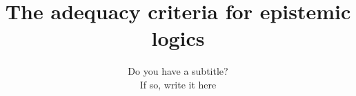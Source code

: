 \usepackage{fancyvrb}
\usepackage{alltt}
\usepackage{listings}

\newcommand{\Rel}[1]{R_{#1}}
\newcommand{\Act}[1]{[ \mathit{#1} ]}
\newcommand{\ActPos}[1]{\langle \mathit{XSTIT_{#1}} \rangle}
\newcommand{\Know}{\mathbf{K}\,} 
\newcommand{\Kns}[1]{\mathbf{K}_{\mathbf{#1}}\,} 
\newcommand{\Bel}{\mathbf{B}\,} 
\newcommand{\Bels}[1]{\mathbf{B}_{\mathbf{#1}}\,} 
\newcommand{\Pos}  {\langle \mathbf{K} \rangle\,} 
\newcommand{\Poss}[1]  {\langle \mathbf{K}_{#1} \rangle\,}
\newcommand{\BPos} {\langle \mathbf{B} \rangle\,}
\newcommand{\BPoss}[1]{\langle \mathbf{B}_{#1} \rangle\,}
\newcommand{\STIT}[1] {\mathbf{[XSTIT\ {#1}]}}
\newcommand{\Safe} {\mathbf{S}}
\newcommand{\safe} {\mathit{safe}}
\newcommand{\choice}[1]{\mathit{Choice_{#1}}}
\newcommand{\neXt}{\mathit{X}}
\newcommand{\Pal}[1]{\mathbf{[#1]}}
\newcommand{\PalPos}[1]{\mathbf{\langle#1\rangle}}
\newcommand{\SPal}[1]{\mathbf{[#1]^\mathcal{S}}}
\newcommand{\SPalPos}[1]{\mathbf{\langle#1\rangle^\mathcal{S}}}
%
\newcommand{\etal}{\textit{et.~al.}}
\newcommand{\nnot}{\textsf{\ not \ }}
\newcommand{\oor}{\textsf{\  or \ }}
\newcommand{\iiff}{{\  \Leftrightarrow \ }}
\newcommand {\aand}{ \textsf{\ and \ } }
\newcommand {\timplies} { \textsf{\ implies \ }}
\newcommand {\tland}{{\ \wedge \ }}
\newcommand {\tlor}{{\ \vee \ }}
\newcommand {\tlnot}{{\neg}}
\newcommand {\iimplies}{{\ \Rightarrow \ }}

\newenvironment{proofenum}{%
	\begin{enumerate}
		\renewcommand\labelenumi{(\arabic{section}.\arabic{enumi})}}
	{\end{enumerate}}
%


\title{The adequacy criteria for epistemic logics%
}
\subtitle{Do you have a subtitle?\\ If so, write it here}


